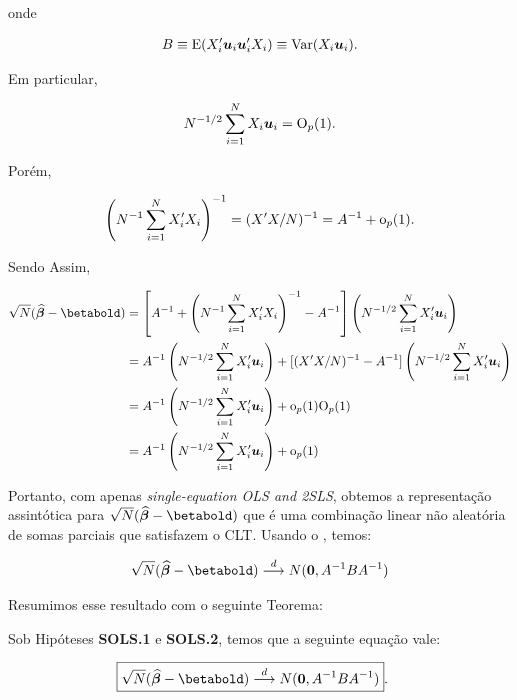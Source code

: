 \documentclass[11pt, oneside, a4paper, article]{article}
\numberwithin{equation}{section}
\begin{document}
\noindent
onde

\vspace{-1 em}
\begin{align*} 
B \equiv \text{E}(X_{i}' \boldsymbol{u}_{i} \boldsymbol{u}_{i}' X_{i}) \equiv \text{Var}(X_{i} \boldsymbol{u}_{i}).
\end{align*}

\noindent
Em particular,

\vspace{-1 em}
\begin{align*} 
N^{-1/2} \sum_{i=1}^{N} X_{i} \boldsymbol{u}_{i} = \text{O}_{p}(1).
\end{align*}

Porém,

\vspace{-1 em}
\begin{align*} 
	\left( N^{-1} \sum_{i=1}^{N} X_{i}' X_{i} \right)^{-1} = (X'X/N)^{-1} = A^{-1} + \text{o}_{p}(1).
\end{align*}

\noindent
Sendo Assim,

\vspace{-1 em}
\begin{align*} 
\sqrt{N}(\betahatbold - \betabold) &= 
\left[ 
A^{-1} +
\left( N^{-1} \sum_{i=1}^{N} X_{i}' X_{i}   \right)^{-1}
- A^{-1}
\right]
\left( N^{-1/2} \sum_{i=1}^{N} X_{i}' \mbs{u}_{i}   \right)
\\ &=
A^{-1}\left( N^{-1/2} \sum_{i=1}^{N} X_{i}' \mbs{u}_{i}   \right)
+
[(X'X/N)^{-1} - A^{-1}]
\left( N^{-1/2} \sum_{i=1}^{N} X_{i}' \mbs{u}_{i}   \right)
\\&=
A^{-1}\left( N^{-1/2} \sum_{i=1}^{N} X_{i}' \mbs{u}_{i}   \right)
+ \litop(1) \bigOp(1)
\\&=
A^{-1}\left( N^{-1/2} \sum_{i=1}^{N} X_{i}' \mbs{u}_{i}   \right)
+ \litop(1)
\end{align*}

Portanto, com apenas \textit{single-equation OLS and 2SLS}, obtemos a representação assintótica para $\sqrt{N}(\betahatbold - \betabold)$ que é uma combinação linear não aleatória de somas parciais que satisfazem o CLT.
Usando o , temos:

\begin{align*} 
\sqrt{N}(\betahatbold - \betabold)
\arrowd
N(\mbs{0}, A^{-1} B A^{-1})
\end{align*}

Resumimos esse resultado com o seguinte Teorema:

\begin{teo1}\label{teo:sols:norm}
Sob Hipóteses \textbf{SOLS.1} e \textbf{SOLS.2}, temos que a seguinte equação vale:

\begin{align} \label{eq:sols:norm}
	\Aboxed{
\sqrt{N}(\betahatbold - \betabold)
\arrowd
N(\mbs{0}, A^{-1} B A^{-1})
}.
\end{align}
\end{teo1}
\end{document}
